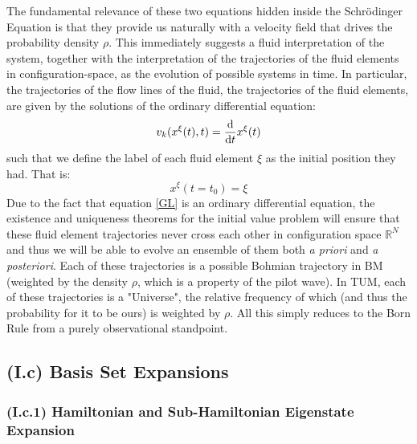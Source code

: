 \documentclass[11pt, a4paper]{article} %
\newcommand{\R}{\mathbb{R}} %
\begin{document}
The fundamental relevance of these two equations hidden inside the Schrödinger Equation is that they provide us naturally with a velocity field that drives the probability density $\rho$. This immediately suggests a fluid interpretation of the system, together with the interpretation of the trajectories of the fluid elements in configuration-space, as the evolution of possible systems in time. In particular, the trajectories of the flow lines of the fluid, the trajectories of the fluid elements, are given by the solutions of the ordinary differential equation:
\begin{equation}\label{GL}
v_k(x^\xi(t),t)=\dv{}{t}x^\xi(t)
\end{equation}
such that we define the label of each fluid element $\xi$ as the initial position they had. That is:
\begin{equation}
x^\xi(t=t_0)=\xi
\end{equation}
Due to the fact that equation \eqref{GL} is an ordinary differential equation, the existence and uniqueness theorems for the initial value problem will ensure that these fluid element trajectories never cross each other in configuration space $\R^N$ and thus we will be able to evolve an ensemble of them both {\em a priori} and {\em a posteriori}. Each of these trajectories is a possible Bohmian trajectory in BM (weighted by the density $\rho$, which is a property of the pilot wave). In TUM, each of these trajectories is a "Universe", the relative frequency of which (and thus the probability for it to be ours) is weighted by $\rho$. All this simply reduces to the Born Rule from a purely observational standpoint.

\subsection*{(I.c) Basis Set Expansions}
\subsubsection*{(I.c.1) Hamiltonian and Sub-Hamiltonian Eigenstate Expansion}
\end{document}
